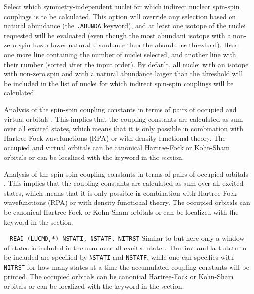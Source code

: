 \begin{description}
Select which symmetry-independent nuclei for which
indirect nuclear spin-spin couplings is to be calculated. This option
will override any
selection based on natural abundance (the \verb|.ABUNDA| keyword), and
at least one isotope of the nuclei requested will be evaluated (even
though the most abundant isotope with a non-zero spin has a lower
natural abundance
than the abundance threshold). Read one more line containing the
number of nuclei selected, and another line with their number (sorted after
the input order). By default, all nuclei with an isotope with non-zero spin
and with a natural abundance larger than the threshold will be included in
the list of nuclei for which indirect spin-spin couplings will be
calculated.

\item [\Key{SOS}]
Analysis of the spin-spin coupling constants in terms of pairs of
occupied and virtual orbitals \cite{spas079,spas086}. This implies that
the coupling constants are calculated as sum over all excited states,
which means that it is only possible in combination with Hartree-Fock
wavefunctions (RPA) or with density functional theory. The occupied and
virtual orbitals can be canonical Hartree-Fock or Kohn-Sham orbitals or
can be localized with the  keyword in the 
section.

\item [\Key{SOSOCC}]
Analysis of the spin-spin coupling constants in terms of pairs of
occupied orbitals \cite{spas079,spas086}. This implies that the
coupling constants are calculated as sum over all excited states, which
means that it is only possible in combination with Hartree-Fock
wavefunctions (RPA) or with density functional theory. The occupied
orbitals can be canonical Hartree-Fock or Kohn-Sham orbitals or can be
localized with the  keyword in the 
section.

\item [\Key{SOSOCS}]\verb| |\newline
  \verb|READ (LUCMD,*) NSTATI, NSTATF, NITRST|\newline
Similar to  but here only a window of states is included in
the sum over all excited states. The first and last state to be
included are specified by \verb|NSTATI| and \verb|NSTATF|, while one
can specifies with \verb|NITRST| for how many states at a time the
accumulated coupling constants will be printed. The occupied orbitals
can be canonical Hartree-Fock or Kohn-Sham orbitals or can be localized
with the  keyword in the  section.


\end{description}
